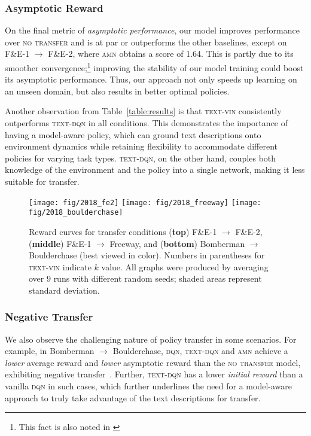 \subsubsection{Asymptotic Reward}
On the final metric of \emph{asymptotic performance}, our model improves performance over  \textsc{no transfer} and is at par or outperforms the other baselines, except on F\&E-1 $\to$ F\&E-2, where \textsc{amn} obtains a score of 1.64. This is partly due to its smoother convergence;\footnote{This fact is also noted in \cite{parisotto2016actor}} improving the stability of our model training could boost its asymptotic performance. Thus, our approach not only speeds up learning on an unseen domain, but also results in better optimal policies.

Another observation from Table~\ref{table:results} is that \textsc{text-vin} consistently outperforms \textsc{text-dqn} in all conditions. This demonstrates the importance of having a model-aware policy, which can ground text descriptions onto environment dynamics while retaining flexibility to accommodate different policies for varying task types. \textsc{text-dqn}, on the other hand, couples both knowledge of the environment and the policy into a single network, making it less suitable for transfer.


\begin{figure}[!h] 
\minipage{\textwidth}
\centering
\texttt{[image: fig/2018\_fe2]}
\endminipage\hfill
\minipage{\textwidth}
\centering
\texttt{[image: fig/2018\_freeway]}
\endminipage\hfill
\minipage{\textwidth}
\centering
\texttt{[image: fig/2018\_boulderchase]}
\endminipage\hfill
\caption{Reward curves for transfer conditions (\textbf{top}) F\&E-1 $\to$ F\&E-2, (\textbf{middle}) F\&E-1 $\to$ Freeway, and (\textbf{bottom}) Bomberman $\to$ Boulderchase (best viewed in color). Numbers in parentheses for \textsc{text-vin} indicate $k$ value. All graphs were produced by averaging over 9 runs with different random seeds; shaded areas represent standard deviation.
}
	\label{fig:results}
\end{figure}



\subsubsection{Negative Transfer}
We also observe the challenging nature of policy transfer in some scenarios. For example, in Bomberman $\rightarrow$ Boulderchase, \textsc{dqn}, \textsc{text-dqn} and \textsc{amn} achieve a \emph{lower} average reward and \emph{lower}  asymptotic reward than the \textsc{no transfer} model, exhibiting negative transfer~\cite{taylor2009transfer}. Further, \textsc{text-dqn} has a lower \emph{initial reward} than a vanilla \textsc{dqn} in such cases, which further underlines the need for a model-aware approach to truly take advantage of the text descriptions for transfer.




